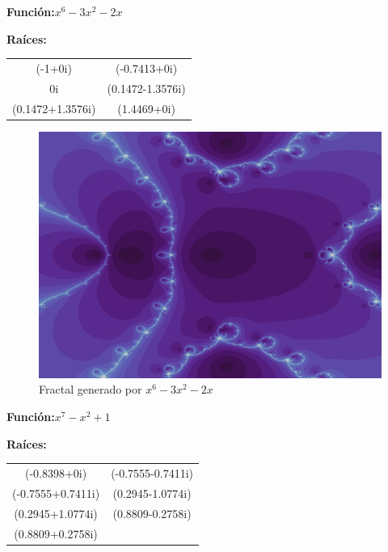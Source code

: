 \textbf{Función:}$x^6-3x^2-2x$

\textbf{Raíces:}

\begin{center}
\begin{tabular}{ c c  }
    (-1+0i) & (-0.7413+0i) \\ 
    0i & (0.1472-1.3576i) \\ 
    (0.1472+1.3576i) & (1.4469+0i)
 
\end{tabular}
\end{center}

\begin{figure}[H]
    \centering
    \includegraphics[scale=0.26]{images/ej4.png}
    \caption{Fractal generado por $x^6-3x^2-2x$}
    \label{fig:ej_4}
\end{figure}

\textbf{Función:}$x^7-x^2+1$

\textbf{Raíces:}

\begin{center}
\begin{tabular}{ c c  }
 (-0.8398+0i) & (-0.7555-0.7411i) \\ 
 (-0.7555+0.7411i) & (0.2945-1.0774i) \\ 
 (0.2945+1.0774i) & (0.8809-0.2758i) \\
 (0.8809+0.2758i)
\end{tabular}
\end{center}

